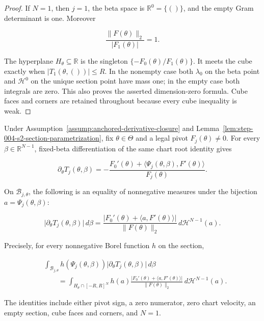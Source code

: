 \begin{proof}
If \(N=1\), then \(j=1\), the beta space is \(\mathbb R^0=\{()\}\), and the empty Gram determinant is one.
Moreover

\begin{equation}
\label{eq:appendix-display-118}
\frac{\lVert F(\theta)\rVert_2}{\lvert F_1(\theta)\rvert}=1.
\end{equation}

The hyperplane \(H_\theta\subseteq\mathbb R\) is the singleton
\(\{-F_0(\theta)/F_1(\theta)\}\). It meets the cube exactly when
\(\lvert T_1(\theta,())\rvert\leq R\). In the nonempty case both \(\lambda_0\) on the beta point and
\(\mathcal H^0\) on the unique section point have mass one; in the empty case both integrals are zero. This
also proves the asserted dimension-zero formula. Cube faces and corners are retained throughout because every
cube inequality is weak. 
\end{proof}

\begin{lemma}
\label{lem:step-004-s2-normal-density}

Under Assumption~\ref{assump:anchored-derivative-closure} and
Lemma~\ref{lem:step-004-s2-section-parametrization}, fix \(\theta\in\Theta\) and a legal pivot
\(F_j(\theta)\neq0\). For every \(\beta\in\mathbb R^{N-1}\), fixed-beta differentiation of the same chart
root identity gives

\begin{equation}
\label{eq:appendix-display-119}
\partial_\theta T_j(\theta,\beta)
=-
\frac{F_0'(\theta)
+\langle\Psi_j(\theta,\beta),F'(\theta)\rangle}
{F_j(\theta)}.
\end{equation}

On \(\mathcal B_{j,\theta}\), the following is an equality of nonnegative measures under the bijection
\(a=\Psi_j(\theta,\beta)\):

\begin{equation}
\label{eq:appendix-display-120}
\lvert\partial_\theta T_j(\theta,\beta)\rvert\,d\beta
=
\frac{\lvert F_0'(\theta)+\langle a,F'(\theta)\rangle\rvert}
{\lVert F(\theta)\rVert_2}
\,d\mathcal H^{N-1}(a).
\end{equation}

Precisely, for every nonnegative Borel function \(h\) on the section,

\begin{equation}
\label{eq:appendix-display-121}
\begin{aligned}
&\int_{\mathcal B_{j,\theta}}
h(\Psi_j(\theta,\beta))
\lvert\partial_\theta T_j(\theta,\beta)\rvert\,d\beta\\
&\qquad=
\int_{H_\theta\cap[-R,R]^N}
h(a)
\frac{\lvert F_0'(\theta)+\langle a,F'(\theta)\rangle\rvert}
{\lVert F(\theta)\rVert_2}
\,d\mathcal H^{N-1}(a).
\end{aligned}
\end{equation}

The identities include either pivot sign, a zero numerator, zero chart velocity, an empty section, cube faces
and corners, and \(N=1\).


\end{lemma}

